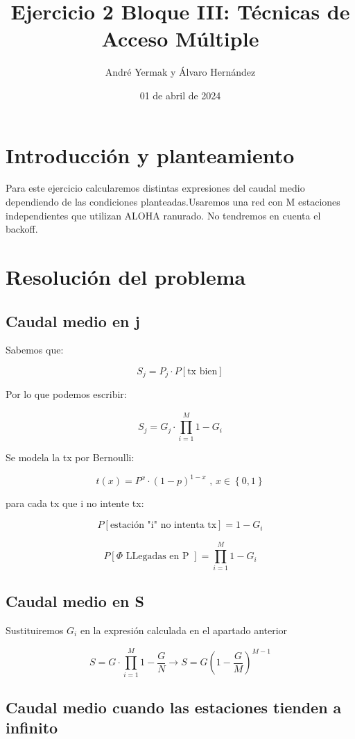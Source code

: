 \documentclass{article}
\title{Ejercicio 2 Bloque III: Técnicas de Acceso Múltiple}
\author{André Yermak y Álvaro Hernández}
\date{01 de abril de 2024}
\begin{document}
\maketitle


\section{Introducción y planteamiento}

Para este ejercicio calcularemos distintas expresiones del caudal medio dependiendo de las condiciones planteadas.Usaremos una red con M estaciones independientes que utilizan ALOHA ranurado. No tendremos en cuenta el backoff.

\section{Resolución del problema}
\subsection{Caudal medio en j}
Sabemos que:

$$S_j = P_j \cdot P[\text{tx bien}]$$

Por lo que podemos escribir:

$$S_j = G_j \cdot \prod_{i=1}^{\substack{M}} 1 - G_i$$

Se modela la tx por Bernoulli:

$$t(x) = P^x \cdot (1-p)^{1-x} \text{ , } x \in \left\{0, 1\right\}$$


para cada tx que i no intente tx:

$$P[\text{estación "i" no intenta tx}] = 1 - G_{i}$$

$$P[ \varPhi \text{ LLegadas en P } ] = \prod_{i=1}^{\substack{M}} 1 - G_i $$




\subsection{Caudal medio en S}

Sustituiremos $G_{i}$ en la expresión calculada en el apartado anterior

$$S = G \cdot \prod_{i=1}^{\substack{M}} 1 - \frac{G}{N} \rightarrow S = G(1 - \frac{G}{M})^{M-1}$$


\subsection{Caudal medio cuando las estaciones tienden a infinito}
\end{document}
